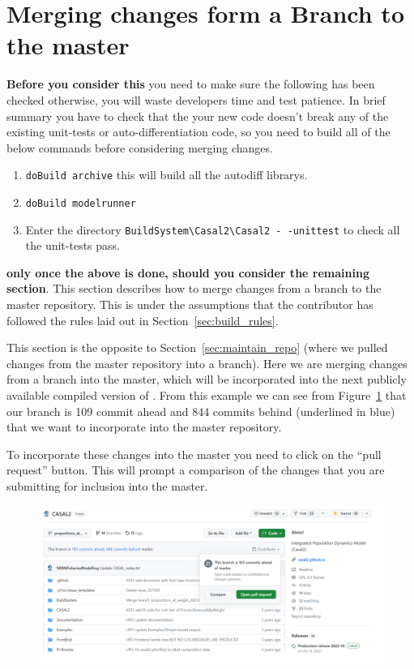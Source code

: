 \section{Merging changes form a Branch to the master\label{sec:pull_requests}}

\textbf{Before you consider this} you need to make sure the following has been checked otherwise, you will waste developers time and test patience. In brief summary you have to check that the your new code doesn't break any of the existing unit-tests or auto-differentiation code, so you need to build all of the below commands before considering merging changes.

\begin{enumerate}
\item \texttt{doBuild archive} this will build all the autodiff librarys.
\item \texttt{doBuild modelrunner}
\item Enter the directory  \texttt{BuildSystem\textbackslash Casal2\textbackslash Casal2 - -unittest} to check all the unit-tests pass.
			
\end{enumerate}


\textbf{only once the above is done, should you consider the remaining section}. This section describes how to merge changes from a branch to the master repository. This is under the assumptions that the contributor has followed the rules laid out in Section~\ref{sec:build_rules}. 

This section is the opposite to Section~\ref{sec:maintain_repo} (where we pulled changes from the master repository into a branch). Here we are merging changes from a branch into the master, which will be incorporated into the next publicly available compiled version of \CNAME. From this example we can see from Figure~\ref{fig:fork_merge1} that our branch is 109 commit ahead and 844 commits behind (underlined in blue) that we want to incorporate into the master repository.

To incorporate these changes into the master you need to click on the \enquote{pull request} button. This will prompt a comparison of the changes that you are submitting for inclusion into the master.
\clearpage
\begin{figure}[!ht]
	\includegraphics[scale=0.6]{Figures/create_pull_request.png}
	\caption{}\label{fig:fork_merge1}
\end{figure}

